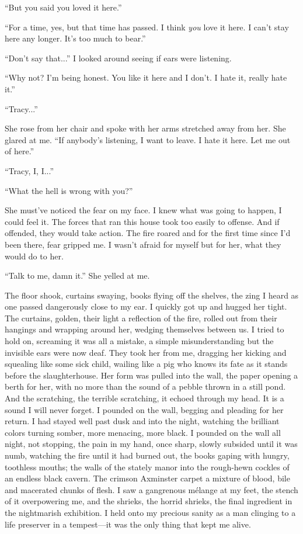 \documentclass[
]{article}
\begin{document}
``But you said you loved it here.''

``For a time, yes, but that time has passed. I think \emph{you} love it
here. I can't stay here any longer. It's too much to bear.''

``Don't say that...'' I looked around seeing if ears were listening.

``Why not? I'm being honest. You like it here and I don't. I hate it,
really hate it.''

``Tracy...''

She rose from her chair and spoke with her arms stretched away from her.
She glared at me. ``If anybody's listening, I want to leave. I hate it
here. Let me out of here.''

``Tracy, I, I...''

``What the hell is wrong with you?''

She must've noticed the fear on my face. I knew what was going to
happen, I could feel it. The forces that ran this house took too easily
to offense. And if offended, they would take action. The fire roared and
for the first time since I'd been there, fear gripped me. I wasn't
afraid for myself but for her, what they would do to her.

``Talk to me, damn it.'' She yelled at me.

The floor shook, curtains swaying, books flying off the shelves, the
zing I heard as one passed dangerously close to my ear. I quickly got up
and hugged her tight. The curtains, golden, their light a reflection of
the fire, rolled out from their hangings and wrapping around her,
wedging themselves between us. I tried to hold on, screaming it was all
a mistake, a simple misunderstanding but the invisible ears were now
deaf. They took her from me, dragging her kicking and squealing like
some sick child, wailing like a pig who knows its fate as it stands
before the slaughterhouse. Her form was pulled into the wall, the paper
opening a berth for her, with no more than the sound of a pebble thrown
in a still pond. And the scratching, the terrible scratching, it echoed
through my head. It is a sound I will never forget. I pounded on the
wall, begging and pleading for her return. I had stayed well past dusk
and into the night, watching the brilliant colors turning somber, more
menacing, more black. I pounded on the wall all night, not stopping, the
pain in my hand, once sharp, slowly subsided until it was numb, watching
the fire until it had burned out, the books gaping with hungry,
toothless mouths; the walls of the stately manor into the rough-hewn
cockles of an endless black cavern. The crimson Axminster carpet a
mixture of blood, bile and macerated chunks of flesh. I saw a gangrenous
mélange at my feet, the stench of it overpowering me, and the shrieks,
the horrid shrieks, the final ingredient in the nightmarish exhibition.
I held onto my precious sanity as a man clinging to a life preserver in
a tempest---it was the only thing that kept me alive.
\end{document}
